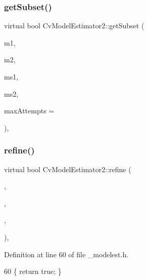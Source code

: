\mbox{\label{class_cv_model_estimator2_a8a1749e60a02a5cb697425bd2daa35af}} 
\subsubsection{\texorpdfstring{get\+Subset()}{getSubset()}}
{\footnotesize\ttfamily virtual bool Cv\+Model\+Estimator2\+::get\+Subset (\begin{DoxyParamCaption}\item[{const Cv\+Mat $\ast$}]{m1,  }\item[{const Cv\+Mat $\ast$}]{m2,  }\item[{Cv\+Mat $\ast$}]{ms1,  }\item[{Cv\+Mat $\ast$}]{ms2,  }\item[{int}]{max\+Attempts = {} }\end{DoxyParamCaption})\hspace{0.3cm}{\ttfamily [protected]}, {\ttfamily [virtual]}}

\mbox{\label{class_cv_model_estimator2_a760edefe34027333ccc6c19e74cb46d1}} 
\subsubsection{\texorpdfstring{refine()}{refine()}}
{\footnotesize\ttfamily virtual bool Cv\+Model\+Estimator2\+::refine (\begin{DoxyParamCaption}\item[{const Cv\+Mat $\ast$}]{,  }\item[{const Cv\+Mat $\ast$}]{,  }\item[{Cv\+Mat $\ast$}]{,  }\item[{int}]{ }\end{DoxyParamCaption})\hspace{0.3cm}{\ttfamily [inline]}, {\ttfamily [virtual]}}



Definition at line 60 of file \+\_\+modelest.\+h.


\begin{DoxyCode}
60 \{ \textcolor{keywordflow}{return} \textcolor{keyword}{true}; \}
\end{DoxyCode}
\mbox{\label{class_cv_model_estimator2_ac8c9c1586d3334f468d4152c67554adc}} 
